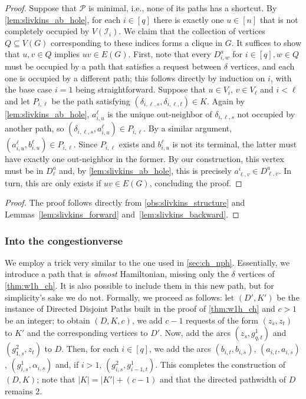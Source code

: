 \documentclass[a4paper,UKenglish,cleveref, autoref, thm-restate]{lipics-v2021}
\newcommand{\pname}[1]{{\sc #1}}
\newcommand{\congestion}{c}
\begin{document}
    \begin{proof}
      Suppose that $\mathcal{P}$ is minimal, i.e., none of its paths has a shortcut.
      By \autoref{lem:slivkins_ab_hole}, for each $i \in [q]$ there is exactly one $u
      \in [n]$ that is not completely occupied by $V(\mathcal{I}_i)$. We claim that the
      collection of vertices $Q \subseteq V(G)$ corresponding to these indices forms a
      clique in $G$.
      It suffices to show that $u,v \in Q$ implies $uv \in E(G)$.
      First, note that every $D^a_{i,w}$ for $i \in [q], w \in Q$ must be occupied by a path that
      satisfies a request between $\delta$ vertices, and each one is occupied by a
      different path; this follows directly by induction on $i$, with the base case $i =
      1$ being straightforward.
      Suppose that $u \in V_i$, $v \in V_\ell$ and $i < \ell$ and let $P_{i,\ell}$ be the
      path satisfying $(\delta_{i,\ell,s}, \delta_{i,\ell,t}) \in K$.
      Again by \autoref{lem:slivkins_ab_hole}, $a^\ell_{i,u}$ is the unique out-neighbor
      of $\delta_{i,\ell,s}$ not occupied by another path, so $(\delta_{i,\ell,s},
      a^\ell_{i,u}) \in P_{i,\ell}$. By a similar argument, $(a^\ell_{i,u}, b^\ell_{i,u})
      \in P_{i,\ell}$.
      Since $P_{i, \ell}$ exists and $b^\ell_{i,u}$ is not its terminal, the latter must
      have exactly one out-neighbor in the former. By our construction, this vertex must be
      in $D^a_\ell$ and, by \autoref{lem:slivkins_ab_hole}, this is precisely
      $a^i_{\ell, v} \in D^a_{\ell, v}$. In turn, this arc only exists if $uv \in E(G)$,
      concluding the proof.
    \end{proof}

    \whch*

    \begin{proof}
      The proof follows directly from \autoref{obs:slivkins_structure} and
      Lemmas~\ref{lem:slivkins_forward} and~\ref{lem:slivkins_backward}.
    \end{proof}

    \subsubsection{Into the congestionverse}
    We employ a trick very similar to the one used in \autoref{sec:ch_nph}.
    Essentially, we introduce a path that is \textit{almost} Hamiltonian, missing only
    the $\delta$ vertices of \autoref{thm:w1h_ch}. It is also possible to include
    them in this new path, but for simplicity's sake we do not.
    Formally, we proceed as follows: let $(D', K')$ be the instance of \pname{Directed
    Disjoint Paths} built in the proof of \autoref{thm:w1h_ch} and $\congestion > 1$ be an
    integer; to obtain $(D, K, \congestion)$,
    we add $\congestion-1$ requests of the form $(z_s, z_t)$ to $K'$ and the corresponding vertices
    to $D'$. Now, add the arcs $(z_s, g^1_{q, t})$ and $(g^2_{1, s}, z_t)$ to $D$.
    Then, for each $i \in [q]$, we add the arcs $(b_{i,t}, b_{i,s})$, $(a_{i,t}, a_{i,
    s})$, $(g^1_{i,s}, \alpha_{i,s})$ and, if $i > 1$, $(g^2_{i,s}, g^1_{i-1,t})$.
    This completes the construction of $(D, K)$; note that $|K| = |K'| + (\congestion-1)$ and that
    the directed pathwidth of $D$ remains 2.
\end{document}
